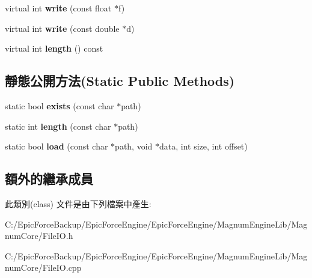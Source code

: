 \begin{DoxyCompactItemize}
\item 
virtual int {\bfseries write} (const float $\ast$f)\hypertarget{class_magnum_1_1_file_i_o_a717fc13d45f26c79c44322b6c026655c}{}\label{class_magnum_1_1_file_i_o_a717fc13d45f26c79c44322b6c026655c}

\item 
virtual int {\bfseries write} (const double $\ast$d)\hypertarget{class_magnum_1_1_file_i_o_a2f5c857bb6d34d628fa076f6cada9395}{}\label{class_magnum_1_1_file_i_o_a2f5c857bb6d34d628fa076f6cada9395}

\item 
virtual int {\bfseries length} () const \hypertarget{class_magnum_1_1_file_i_o_ab8d1462bae8aaf71c9321aa72d0edf6f}{}\label{class_magnum_1_1_file_i_o_ab8d1462bae8aaf71c9321aa72d0edf6f}

\end{DoxyCompactItemize}
\subsection*{靜態公開方法(Static Public Methods)}
\begin{DoxyCompactItemize}
\item 
static bool {\bfseries exists} (const char $\ast$path)\hypertarget{class_magnum_1_1_file_i_o_a98e9c25720573d3f62ec26ef845a1f74}{}\label{class_magnum_1_1_file_i_o_a98e9c25720573d3f62ec26ef845a1f74}

\item 
static int {\bfseries length} (const char $\ast$path)\hypertarget{class_magnum_1_1_file_i_o_a677488f8333b28a1a929b928646d639d}{}\label{class_magnum_1_1_file_i_o_a677488f8333b28a1a929b928646d639d}

\item 
static bool {\bfseries load} (const char $\ast$path, void $\ast$data, int size, int offset)\hypertarget{class_magnum_1_1_file_i_o_a1272a9116e11892e432a0d2299aad208}{}\label{class_magnum_1_1_file_i_o_a1272a9116e11892e432a0d2299aad208}

\end{DoxyCompactItemize}
\subsection*{額外的繼承成員}


此類別(class) 文件是由下列檔案中產生\+:\begin{DoxyCompactItemize}
\item 
C\+:/\+Epic\+Force\+Backup/\+Epic\+Force\+Engine/\+Epic\+Force\+Engine/\+Magnum\+Engine\+Lib/\+Magnum\+Core/File\+I\+O.\+h\item 
C\+:/\+Epic\+Force\+Backup/\+Epic\+Force\+Engine/\+Epic\+Force\+Engine/\+Magnum\+Engine\+Lib/\+Magnum\+Core/File\+I\+O.\+cpp\end{DoxyCompactItemize}
